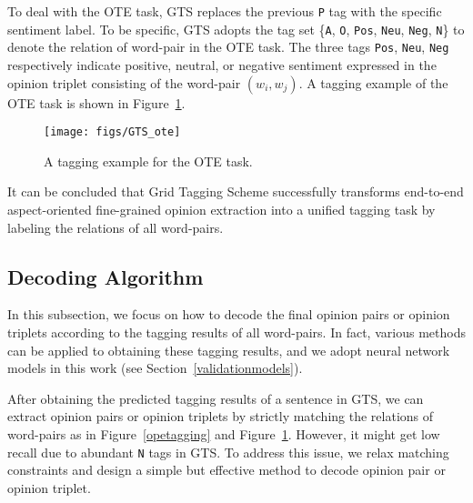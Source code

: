 \documentclass[11pt,a4paper]{article}
\begin{document}
To deal with the OTE task, GTS replaces the previous \texttt{P} tag with the specific sentiment label. To be specific, GTS adopts the tag set \{\texttt{A}, \texttt{O}, \texttt{Pos}, \texttt{Neu}, \texttt{Neg}, \texttt{N}\} to denote the relation of word-pair in the OTE task. The three tags \texttt{Pos}, \texttt{Neu}, \texttt{Neg} respectively indicate positive, neutral, or negative sentiment expressed in the opinion triplet consisting of the word-pair $(w_i, w_j)$. A tagging example of the OTE task is shown in Figure~\ref{otetagging}.

\begin{figure}[h]
	\centering
	\texttt{[image: figs/GTS\_ote]}
	\caption{A tagging example for the OTE task.}
	\label{otetagging}
\end{figure} 

It can be concluded that Grid Tagging Scheme successfully transforms end-to-end aspect-oriented fine-grained opinion extraction into a unified tagging task by labeling the relations of all word-pairs.

\subsection{Decoding Algorithm}
In this subsection, we focus on how to decode the final opinion pairs or opinion triplets according to the tagging results of all word-pairs. In fact, various methods can be applied to obtaining these tagging results, and we adopt neural network models in this work (see Section~\ref{validationmodels}).

After obtaining the predicted tagging results of a sentence in GTS, we can extract opinion pairs or opinion triplets by strictly matching the relations of word-pairs as in Figure~\ref{opetagging} and Figure~\ref{otetagging}. However, it might get low recall due to abundant \texttt{N} tags in GTS. To address this issue, we relax matching constraints and design a simple but effective method to decode opinion pair or opinion triplet.
\end{document}
